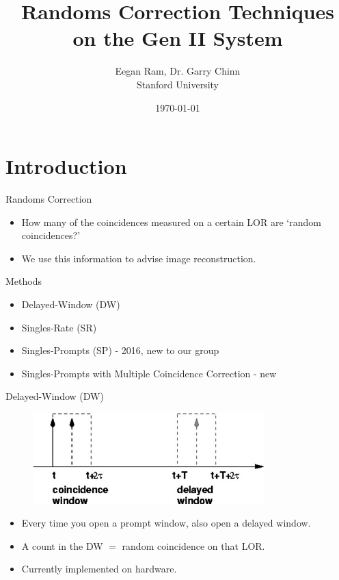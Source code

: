 \documentclass[pdf]{beamer}
\title[Randoms Correction]{Randoms Correction Techniques \\ on the Gen II System}
\author[Eegan Ram]{Eegan Ram, Dr. Garry Chinn \texorpdfstring{\\}{}
\texorpdfstring{Stanford University}{}}
\date{\today}
\begin{document}
\begin{frame}
\thispagestyle{empty}          %
\titlepage
\end{frame}
\addtocounter{framenumber}{-1} %

\section{Introduction}

\begin{frame}{Randoms Correction}
    \begin{itemize}
        \item How many of the coincidences measured on a certain LOR are `random coincidences?'
        \item We use this information to advise image reconstruction.
    \end{itemize}
\end{frame}

\begin{frame}{Methods}
    \begin{itemize}
        \item Delayed-Window (DW)
        \item Singles-Rate (SR)
        \item Singles-Prompts (SP) - 2016, new to our group
        \item Singles-Prompts with Multiple Coincidence Correction - new
    \end{itemize}
\end{frame}

\begin{frame}{Delayed-Window (DW)}
    \begin{figure}[H]
        \centering
        \includegraphics[width=0.8\textwidth]{figures/dwdemo.png}
    \end{figure}
    \begin{itemize}
        \item Every time you open a prompt window, also open a delayed window.
        \item A count in the DW $=$ random coincidence on that LOR.
        \item Currently implemented on hardware.
    \end{itemize}
\end{frame}
\end{document}
